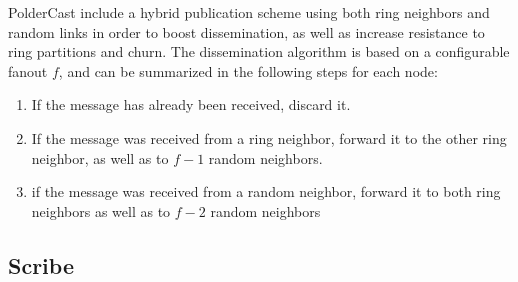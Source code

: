 
PolderCast include a hybrid publication scheme using both
ring neighbors and random links in order to boost
dissemination, as well as increase resistance to ring
partitions and churn. The dissemination algorithm is based
on a configurable fanout $f$, and can be summarized in the
following steps for each node:

\begin{enumerate}
    \item If the message has already been received, discard it.
    \item If the message was received from a ring neighbor, forward it
        to the other ring neighbor, as well as to $f-1$ random
        neighbors.
    \item if the message was received from a random neighbor,
        forward it to both ring neighbors as well as to $f-2$ random
        neighbors
\end{enumerate}

\clearpage
\subsection{Scribe}

